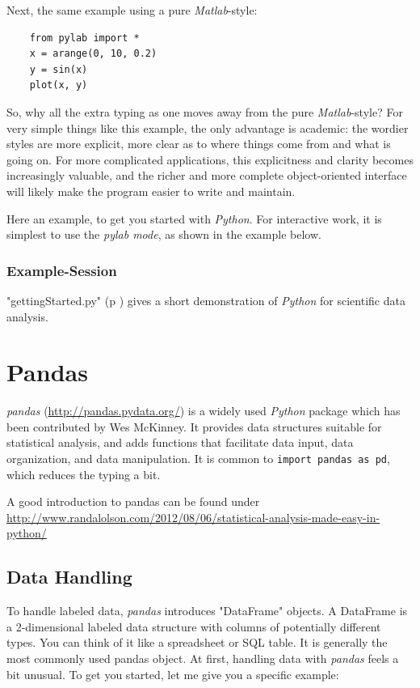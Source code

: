 Next, the same example using a pure \emph{Matlab}-style:

\begin{lstlisting}
    from pylab import *
    x = arange(0, 10, 0.2)
    y = sin(x)
    plot(x, y)
\end{lstlisting}

So, why all the extra typing as one moves away from the pure \emph{Matlab}-style? For very simple things like this example, the only advantage is academic: the wordier styles are more explicit, more clear as to where things come from and what is going on. For more complicated applications, this explicitness and clarity becomes increasingly valuable, and the richer and more complete object-oriented interface will likely make the program easier to write and maintain.

Here an example, to get you started with \emph{Python}. For interactive work, it is simplest to use the \emph{pylab mode}, as shown in the example below.

\subsubsection{Example-Session}

\PyImg "gettingStarted.py" (p \pageref{py:gettingStarted_ipy}) gives a short demonstration of \emph{Python} for scientific data analysis.


\section{Pandas}

\emph{pandas} (\url{http://pandas.pydata.org/}) is a widely used \emph{Python} package which has been contributed by Wes McKinney. It provides data structures suitable for statistical analysis, and adds functions that facilitate
data input, data organization, and data manipulation. It is common to \lstinline{import pandas as pd}, which reduces the typing a bit.

A good introduction to pandas can be found under
\url{http://www.randalolson.com/2012/08/06/statistical-analysis-made-easy-in-python/}

\subsection{Data Handling}


To handle labeled data, \emph{pandas} introduces "DataFrame" objects. A DataFrame is a 2-dimensional labeled data structure with columns of potentially different types. You can think of it like a spreadsheet or SQL table. It is generally the most commonly used pandas object.
At first, handling data with \emph{pandas} feels a bit unusual. To get you started, let me give you a specific example:

